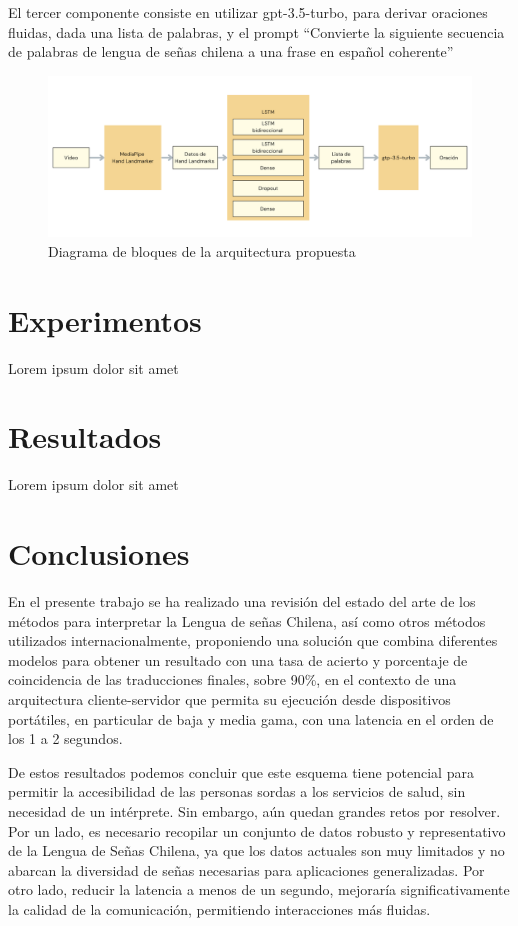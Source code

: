 \documentclass{article}
\begin{document}
El tercer componente consiste en utilizar gpt-3.5-turbo, para derivar oraciones fluidas, dada una lista de palabras, y el prompt “Convierte la siguiente secuencia de palabras de lengua de señas chilena a una frase en español coherente”

\begin{figure}[!hbtp]
    \centering
    \includegraphics[width=5in]{figuras/architecture-diagram.png}
		\caption{Diagrama de bloques de la arquitectura propuesta}
		\label{fig1}
\end{figure}

\section{Experimentos}

Lorem ipsum dolor sit amet

\section{Resultados}

Lorem ipsum dolor sit amet


\section{Conclusiones}

En el presente trabajo se ha realizado una revisión del estado del arte de los métodos para interpretar la Lengua de señas Chilena, así como otros métodos utilizados internacionalmente, proponiendo una solución que combina diferentes modelos para obtener un resultado con una tasa de acierto y porcentaje de coincidencia de las traducciones finales, sobre 90\%, en el contexto de una arquitectura cliente-servidor que permita su ejecución desde dispositivos portátiles, en particular de baja y media gama, con una latencia en el orden de los 1 a 2 segundos.


De estos resultados podemos concluir que este esquema tiene potencial para permitir la accesibilidad de las personas sordas a los servicios de salud, sin necesidad de un intérprete. Sin embargo, aún quedan grandes retos por resolver. Por un lado, es necesario recopilar un conjunto de datos robusto y representativo de la Lengua de Señas Chilena, ya que los datos actuales son muy limitados y no abarcan la diversidad de señas necesarias para aplicaciones generalizadas. Por otro lado, reducir la latencia a menos de un segundo, mejoraría significativamente la calidad de la comunicación, permitiendo interacciones más fluidas.
\end{document}
